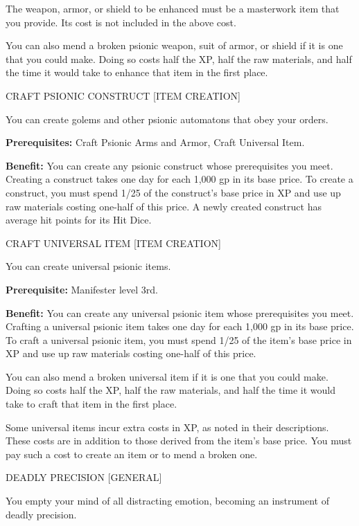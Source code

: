 \documentclass{article}
\begin{document}
The weapon, armor, or shield to be enhanced must be a masterwork item that you 
provide. Its cost is not included in the above cost.

You can also mend a broken psionic weapon, suit of armor, or shield if it is one 
that you could make. Doing so costs half the XP, half the raw materials, and half 
the time it would take to enhance that item in the first place.

\vspace{12pt}
CRAFT PSIONIC CONSTRUCT [ITEM CREATION]

You can create golems and other psionic automatons that obey your orders.

\textbf{Prerequisites:} Craft Psionic Arms and Armor, Craft Universal Item.

\textbf{Benefit:} You can create any psionic construct whose prerequisites you 
meet. Creating a construct takes one day for each 1,000 gp in its base price. To 
create a construct, you must spend 1/25 of the construct's base price in XP and 
use up raw materials costing one-half of this price. A newly created construct 
has average hit points for its Hit Dice.

\vspace{12pt}
CRAFT UNIVERSAL ITEM [ITEM CREATION]

You can create universal psionic items.

\textbf{Prerequisite:} Manifester level 3rd.

\textbf{Benefit:} You can create any universal psionic item whose prerequisites 
you meet. Crafting a universal psionic item takes one day for each 1,000 gp in 
its base price. To craft a universal psionic item, you must spend 1/25 of the item's 
base price in XP and use up raw materials costing one-half of this price.

You can also mend a broken universal item if it is one that you could make. Doing 
so costs half the XP, half the raw materials, and half the time it would take to 
craft that item in the first place.

Some universal items incur extra costs in XP, as noted in their descriptions. These 
costs are in addition to those derived from the item's base price. You must pay 
such a cost to create an item or to mend a broken one.

\vspace{12pt}
DEADLY PRECISION [GENERAL]

You empty your mind of all distracting emotion, becoming an instrument of deadly 
precision.
\end{document}
